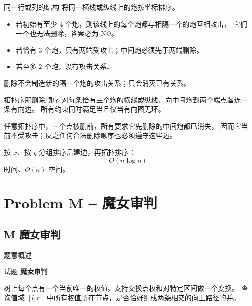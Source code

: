 \documentclass{beamer}
\newcommand{\TT}[1]{{\ttfamily #1}}
\newcommand{\BF}[1]{\textbf{#1}}
\begin{document}
{{\begin{frame}{同一行或列的结构}
  将同一横线或纵线上的炮按坐标排序。
  \begin{itemize}
    \item 若初始有至少 $4$ 个炮，则该线上的每个炮都与相隔一个的炮互相攻击，
    它们一个也无法删除，答案必为 \TT{NO}。
    \item 若恰有 $3$ 个炮，只有两端受攻击；中间炮必须先于两端删除。
    \item 若至多 $2$ 个炮，没有攻击关系。
  \end{itemize}
  删除不会制造新的隔一个炮的攻击关系；只会消灭已有关系。
\end{frame}

\begin{frame}{拓扑序即删除顺序}
  对每条恰有三个炮的横线或纵线，向中间炮到两个端点各连一条有向边。
  所有约束同时满足当且仅当有向图无环。

  \vspace{0.5em}
  任意拓扑序中，一个点被删前，所有要求它先删除的中间炮都已消失，
  因而它当前不受攻击；反之任何合法删除顺序也必须遵守这些边。

  \vspace{0.5em}
  按 $x$、按 $y$ 分组排序后建边，再拓扑排序：
  \[
    O(n\log n)
  \]
  时间、$O(n)$ 空间。
\end{frame}}

{
\section[M]{Problem M -- 魔女审判}
\subsection{M 魔女审判}
\begin{frame}{题意概述}
  \begin{center}试题 \myboxxiii{\BF{\TT{M}}} \BF{魔女审判}\end{center}
  树上每个点有一个当前唯一的权值。支持交换点权和对特定区间做一个变换。
  查询值域 $[l,r]$ 中所有权值所在节点，是否恰好组成两条相交的向上路径的并。
\end{frame}

}}
\end{document}
